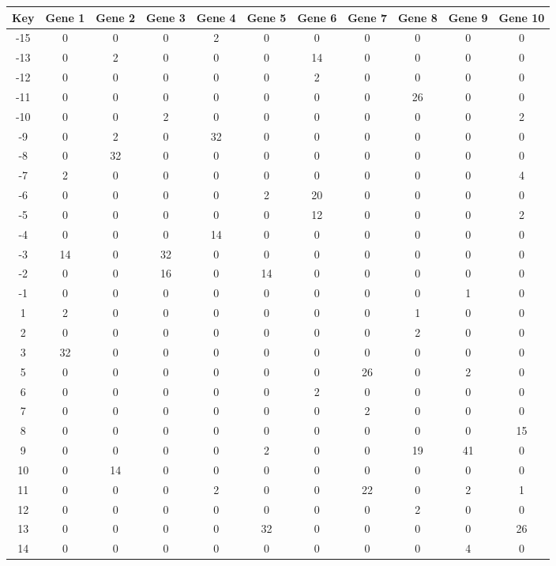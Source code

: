 \begin{tabular}{|c|c|c|c|c|c|c|c|c|c|c|}
\hline
Key & Gene 1 & Gene 2 & Gene 3 & Gene 4 & Gene 5 & Gene 6 & Gene 7 & Gene 8 & Gene 9 & Gene 10 \\
\hline
-15 & 0 & 0 & 0 & 2 & 0 & 0 & 0 & 0 & 0 & 0 \\
-13 & 0 & 2 & 0 & 0 & 0 & 14 & 0 & 0 & 0 & 0 \\
-12 & 0 & 0 & 0 & 0 & 0 & 2 & 0 & 0 & 0 & 0 \\
-11 & 0 & 0 & 0 & 0 & 0 & 0 & 0 & 26 & 0 & 0 \\
-10 & 0 & 0 & 2 & 0 & 0 & 0 & 0 & 0 & 0 & 2 \\
-9 & 0 & 2 & 0 & 32 & 0 & 0 & 0 & 0 & 0 & 0 \\
-8 & 0 & 32 & 0 & 0 & 0 & 0 & 0 & 0 & 0 & 0 \\
-7 & 2 & 0 & 0 & 0 & 0 & 0 & 0 & 0 & 0 & 4 \\
-6 & 0 & 0 & 0 & 0 & 2 & 20 & 0 & 0 & 0 & 0 \\
-5 & 0 & 0 & 0 & 0 & 0 & 12 & 0 & 0 & 0 & 2 \\
-4 & 0 & 0 & 0 & 14 & 0 & 0 & 0 & 0 & 0 & 0 \\
-3 & 14 & 0 & 32 & 0 & 0 & 0 & 0 & 0 & 0 & 0 \\
-2 & 0 & 0 & 16 & 0 & 14 & 0 & 0 & 0 & 0 & 0 \\
-1 & 0 & 0 & 0 & 0 & 0 & 0 & 0 & 0 & 1 & 0 \\
1 & 2 & 0 & 0 & 0 & 0 & 0 & 0 & 1 & 0 & 0 \\
2 & 0 & 0 & 0 & 0 & 0 & 0 & 0 & 2 & 0 & 0 \\
3 & 32 & 0 & 0 & 0 & 0 & 0 & 0 & 0 & 0 & 0 \\
5 & 0 & 0 & 0 & 0 & 0 & 0 & 26 & 0 & 2 & 0 \\
6 & 0 & 0 & 0 & 0 & 0 & 2 & 0 & 0 & 0 & 0 \\
7 & 0 & 0 & 0 & 0 & 0 & 0 & 2 & 0 & 0 & 0 \\
8 & 0 & 0 & 0 & 0 & 0 & 0 & 0 & 0 & 0 & 15 \\
9 & 0 & 0 & 0 & 0 & 2 & 0 & 0 & 19 & 41 & 0 \\
10 & 0 & 14 & 0 & 0 & 0 & 0 & 0 & 0 & 0 & 0 \\
11 & 0 & 0 & 0 & 2 & 0 & 0 & 22 & 0 & 2 & 1 \\
12 & 0 & 0 & 0 & 0 & 0 & 0 & 0 & 2 & 0 & 0 \\
13 & 0 & 0 & 0 & 0 & 32 & 0 & 0 & 0 & 0 & 26 \\
14 & 0 & 0 & 0 & 0 & 0 & 0 & 0 & 0 & 4 & 0 \\
\hline
\end{tabular}